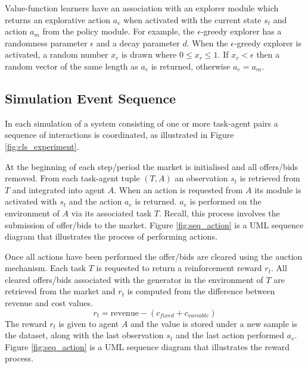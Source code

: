 
Value-function learners have an association with an explorer module which
returns an explorative action $a_e$ when activated with the current state $s_t$
and action $a_m$ from the policy module.  For example, the $\epsilon$-greedy
explorer has a randomness parameter $\epsilon$ and a decay parameter $d$.  When
the $\epsilon$-greedy explorer is activated, a random number $x_r$ is drawn
where $0 \leq x_r \leq 1$.  If $x_r < \epsilon$ then a random vector of the same
length as $a_e$ is returned, otherwise $a_e = a_m$.

\subsection{Simulation Event Sequence}

%

In each simulation of a system consisting of one or more task-agent pairs a
sequence of interactions is coordinated, as illustrated in Figure
\ref{fig:cls_experiment}.

%

At the beginning of each step/period the market is initialised and all
offers/bids removed.  From each task-agent tuple $(T,A)$ an observation $s_t$
is retrieved from $T$ and integrated into agent $A$.  When an action is
requested from $A$ its module is activated with $s_t$ and the action $a_e$ is
returned.  $a_e$ is performed on the environment of $A$ via its associated task
$T$.  Recall, this process involves the submission of offer/bids to the market.
Figure \ref{fig:seq_action} is a UML sequence diagram that illustrates the
process of performing actions.

%

Once all actions have been performed the offer/bids are cleared using the
auction mechanism.  Each task $T$ is requested to return a reinforcement reward
$r_t$. All cleared offers/bids associated with the generator in the environment
of $T$ are retrieved from the market and $r_t$ is computed from the difference
between revenue and cost values.
\begin{equation}
r_t = \mbox{revenue} - (c_{fixed} + c_{variable})
\end{equation}
The reward $r_t$ is given to agent $A$ and the value is stored under a new
sample is the dataset, along with the last observation $s_t$ and the last action
performed $a_e$.  Figure \ref{fig:seq_action} is a UML sequence diagram that
illustrates the reward process.

